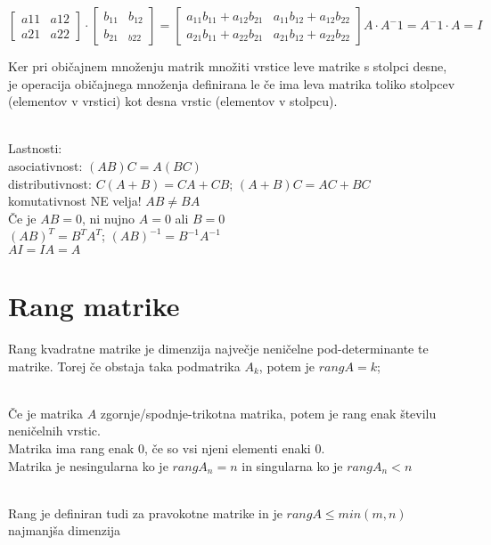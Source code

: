\documentclass[12pt]{report}
\begin{document}
\[\begin{bmatrix}a11 &a12 \\ a21 &a22 \end{bmatrix}\cdot \begin{bmatrix}b_{11} &b_{12} \\ b_{21} &_{b22} \end{bmatrix}=\begin{bmatrix}a_{11}b_{11}+a_{12}b_{21} &a_{11}b_{12}+a_{12}b_{22} \\ a_{21}b_{11}+a_{22}b_{21} &a_{21}b_{12}+a_{22}b_{22} \end{bmatrix}
A\cdot A^-1 = A^-1\cdot A = I\]

Ker pri običajnem množenju matrik množiti vrstice leve matrike s stolpci desne, je operacija običajnega množenja definirana le če ima leva matrika toliko stolpcev (elementov v vrstici)  kot desna vrstic (elementov v stolpcu).\\\

Lastnosti:\\
asociativnost: $(AB)C=A(BC)$\\
distributivnost: $C(A+B)=CA+CB$; $(A+B)C=AC+BC$\\  
komutativnost NE velja! $AB \neq BA$ \\
Če je $AB = 0$, ni nujno $A=0$ ali $B=0$\\
$(AB)^T= B^T A^T$; $(AB)^{-1} = B^{-1} A^{-1}$\\
$AI=IA = A$\\


\pagebreak
\section*{Rang matrike}

Rang kvadratne matrike je dimenzija največje neničelne pod-determinante te matrike. Torej če obstaja taka podmatrika $A_k$, potem je $rangA = k$;\\\

Če je matrika $A$ zgornje/spodnje-trikotna matrika, potem je rang enak številu neničelnih vrstic.\\
Matrika ima rang enak $0$, če so vsi njeni elementi enaki $0$.\\
Matrika je nesingularna ko je $rangA_n= n$ in singularna ko je $rangA_n<n$\\\


Rang je definiran tudi za pravokotne matrike in je $rangA \leq min(m,n)$ najmanjša dimenzija\\\
\end{document}
